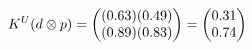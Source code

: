 \documentclass[preview]{standalone}
\begin{document}
\begin{align*}
\special{dvisvgm:raw <g id='unique000'>}K^U(d \otimes p) = \begin{pmatrix} (0.63)(0.49) \\ (0.89)(0.83) \end{pmatrix} = \begin{pmatrix} 0.31 \\ 0.74 \end{pmatrix}\special{dvisvgm:raw </g>}
\end{align*}
\end{document}
